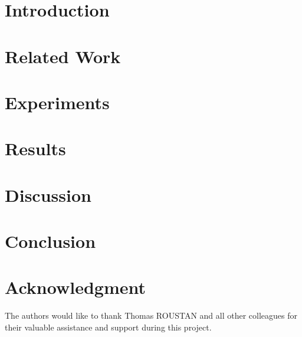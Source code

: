 \documentclass[conference]{IEEEtran}
\begin{document}
    \section{Introduction}\label{sec:introduction}
    


    \section{Related Work}\label{sec:related-work}
    


    \section{Experiments}\label{sec:experiments}
    


    \section{Results}\label{sec:results}
    


    \section{Discussion}\label{sec:discussion}
    


    \section{Conclusion}\label{sec:conclusion}
    

    \section*{Acknowledgment}
    The authors would like to thank Thomas ROUSTAN and all other colleagues for their valuable assistance and support
    during this project.
    \vspace{1em}

    
    
\end{document}
